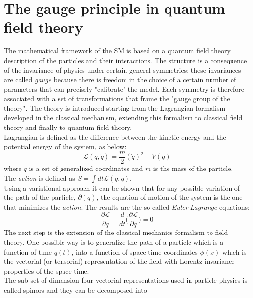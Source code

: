 \section{The gauge principle in quantum field theory}

The mathematical framework of the SM is based on a quantum field theory description of the particles and their interactions.
The structure is a consequence of the invariance of physics under certain general symmetries:
these invariances are called \textit{gauge} because there is freedom in the choice of a certain number of parameters
that can precisely "calibrate" the model.
Each symmetry is therefore associated with a set of transformations that frame the "gauge group of the theory".
The theory is introduced starting from the Lagrangian formalism developed in the classical mechanism, extending this formalism to
classical field theory and finally to quantum field theory.
\vspace{\baselineskip}
 \\Lagrangian is defined as the difference between the kinetic energy and the potential energy of the system, as below:
\begin{equation}
\mathcal{L} (q,\dot{q}) =  \frac{m}{2}(\dot{q})^2-V(q)
\end{equation}
where $q$ is a set of generalized coordinates and $m$ is the mass of the particle.\\
The \textit{action} is defined as $ S = \int dt \mathcal{L} (q,\dot{q}) $.
\vspace{\baselineskip}
\\Using a variational approach it can be shown that for any possible variation of the path of the particle, $\partial(q)$,
the equation of motion of the system is  the one that minimizes the \textit{action}.
The results are the so called \textit{Euler-Lagrange} equations:
\begin{equation}
	\frac{\partial\mathcal{L}}{\partial q} -  \frac{d}{dt}\bigg(\frac{\partial\mathcal{L}}{\partial\dot{q}}\bigg)=0
\end{equation}
The next step is the extension of the classical mechanics formalism  to field theory. One possible way is to generalize 
the path of a particle which is a function of time $q(t)$, into a function of space-time coordinates $\phi(x)$ which is the
vectorial (or tensorial) representation of the field with Lorentz invariance properties of the space-time.\\
The sub-set of dimension-four vectorial representations used in particle physics is called spinors and they can be decomposed into
